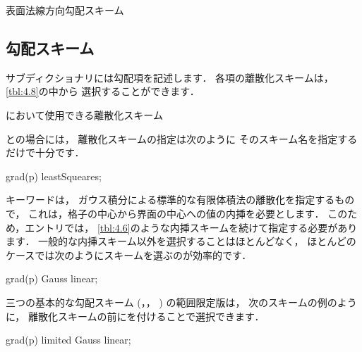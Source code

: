 \begin{table}[ht]
 
 \caption{表面法線方向勾配スキーム}
 \label{tbl:4.7}
\end{table}


\subsection{勾配スキーム}
\label{ssec:4.4.3}
サブディクショナリには勾配項を記述します．
各項の離散化スキームは，\autoref{tbl:4.8}の中から
選択することができます．


\begin{table}[ht]
 
 \caption{において使用できる離散化スキーム}
 \label{tbl:4.8}
\end{table}


との場合には，
離散化スキームの指定は次のように
そのスキーム名を指定するだけで十分です．
\begin{OFverbatim}[file]
grad(p) leastSqueares;
\end{OFverbatim}
キーワードは，
ガウス積分による標準的な有限体積法の離散化を指定するもので，
これは，格子の中心から界面の中心への値の内挿を必要とします．
このため，エントリでは，
\autoref{tbl:4.6}のような内挿スキームを続けて指定する必要があります．
一般的な内挿スキーム以外を選択することはほとんどなく，
ほとんどのケースでは次のようにスキームを選ぶのが効率的です．
\begin{OFverbatim}[file]
grad(p) Gauss linear;
\end{OFverbatim}
三つの基本的な勾配スキーム (，，
) の範囲限定版は，
次のスキームの例のように，
離散化スキームの前にを付けることで選択できます．
\begin{OFverbatim}[file]
grad(p) limited Gauss linear;
\end{OFverbatim}


